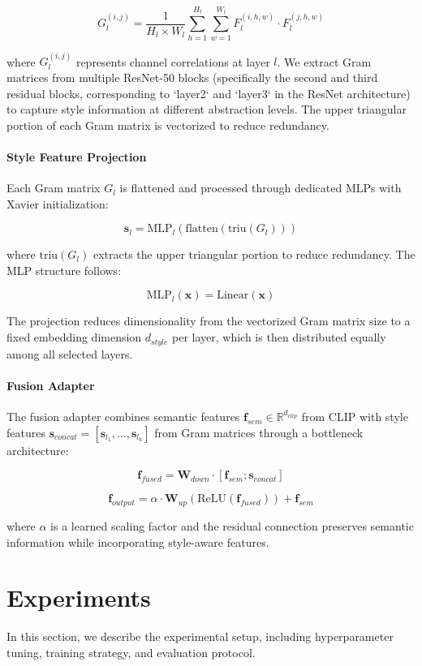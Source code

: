 \documentclass[conference,6pt]{IEEEtran}
\begin{document}
\[
G_l^{(i,j)} = \frac{1}{H_l \times W_l} \sum_{h=1}^{H_l} \sum_{w=1}^{W_l} F_l^{(i,h,w)} \cdot F_l^{(j,h,w)}
\]

where $G_l^{(i,j)}$ represents channel correlations at layer $l$. We extract Gram matrices from multiple ResNet-50 blocks (specifically the second and third residual blocks, corresponding to `layer2` and `layer3` in the ResNet architecture) to capture style information at different abstraction levels. The upper triangular portion of each Gram matrix is vectorized to reduce redundancy.

\paragraph{Style Feature Projection}

Each Gram matrix $G_l$ is flattened and processed through dedicated MLPs with Xavier initialization:

\[
\mathbf{s}_l = \text{MLP}_l(\text{flatten}(\text{triu}(G_l)))
\]

where $\text{triu}(G_l)$ extracts the upper triangular portion to reduce redundancy. The MLP structure follows:

\[
\text{MLP}_l(\mathbf{x}) = \text{Linear}(\mathbf{x})
\]

The projection reduces dimensionality from the vectorized Gram matrix size to a fixed embedding dimension $d_{style}$ per layer, which is then distributed equally among all selected layers.

\paragraph{Fusion Adapter}

The fusion adapter combines semantic features $\mathbf{f}_{sem} \in \mathbb{R}^{d_{clip}}$ from CLIP with style features $\mathbf{s}_{concat} = [\mathbf{s}_{l_1}, ..., \mathbf{s}_{l_k}]$ from Gram matrices through a bottleneck architecture:

\[
\mathbf{f}_{fused} = \mathbf{W}_{down} \cdot [\mathbf{f}_{sem}; \mathbf{s}_{concat}]
\]

\[
\mathbf{f}_{output} = \alpha \cdot \mathbf{W}_{up}(\text{ReLU}(\mathbf{f}_{fused})) + \mathbf{f}_{sem}
\]

where $\alpha$ is a learned scaling factor and the residual connection preserves semantic information while incorporating style-aware features.

\section{Experiments}
In this section, we describe the experimental setup, including hyperparameter tuning, training strategy, and evaluation protocol.
\end{document}
